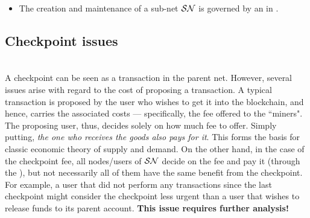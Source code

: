 \begin{itemize}
\begin{enumerate}
    \end{enumerate}
    Notice that the two purposes of the checkpointing routine are theoretically independent of each other. In practice, however, they will probably be combined so further thought on the matter is warranted.
        \footnote{Simplifies things and should be sufficient. In order to reduce load from the parent, all of the changes that happened in the sub-net since the last checkpoint should be compressed into an efficient state-transfer operation. Hence, general state compression might be problematic. Accounts balance is easy to do and fits most uses. A future question would be extending to other states besides balances.}
    \item The creation and maintenance of a sub-net $\SN$ is governed by an \actor{} in \parent{$\SN$}.
    
\end{itemize}

\subsection{Checkpoint issues}
\\
A checkpoint can be seen as a transaction in the parent net.
However, several issues arise with regard to the cost of proposing a transaction.
A typical transaction is proposed by the user who wishes to get it into the blockchain, and hence, carries the associated costs --- specifically, the fee offered to the ``miners".
The proposing user, thus, decides solely on how much fee to offer. Simply putting, \emph{the one who receives the goods also pays for it}.
This forms the basis for classic economic theory of supply and demand.
On the other hand, in the case of the checkpoint fee, all nodes/users of $\SN$ decide on the fee and pay it (through the \actor), but not necessarily all of them have the same benefit from the checkpoint. 
For example, a user that did not perform any transactions since the last checkpoint might consider the checkpoint less urgent than a user that wishes to release funds to its parent account. 
\textbf{This issue requires further analysis!}

